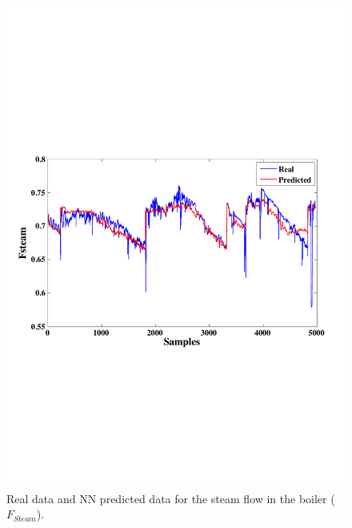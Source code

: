 \begin{figure}
\centering
\includegraphics[width=1\textwidth]{ANN-EXHAUSTRECOVERY.pdf}
\caption{Real data and NN predicted data for the steam flow in the boiler ($F_{Steam}$).}
\label{Fboiler}
\end{figure}


